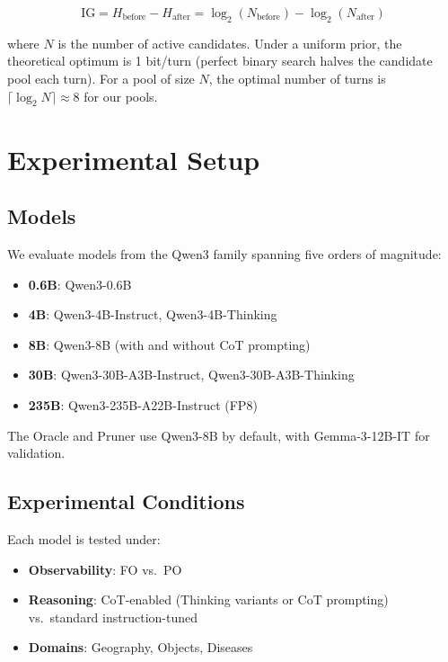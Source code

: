 \documentclass[11pt]{article}
\begin{document}
\begin{equation}
    \text{IG} = H_{\text{before}} - H_{\text{after}} = \log_2(N_{\text{before}}) - \log_2(N_{\text{after}})
\end{equation}

where $N$ is the number of active candidates. Under a uniform prior, the theoretical optimum is 1 bit/turn (perfect binary search halves the candidate pool each turn). For a pool of size $N$, the optimal number of turns is $\lceil \log_2 N \rceil \approx 8$ for our pools.

\section{Experimental Setup}
\label{sec:setup}

\subsection{Models}

We evaluate models from the Qwen3 family spanning five orders of magnitude:
\begin{itemize}
    \item \textbf{0.6B}: Qwen3-0.6B
    \item \textbf{4B}: Qwen3-4B-Instruct, Qwen3-4B-Thinking
    \item \textbf{8B}: Qwen3-8B (with and without CoT prompting)
    \item \textbf{30B}: Qwen3-30B-A3B-Instruct, Qwen3-30B-A3B-Thinking
    \item \textbf{235B}: Qwen3-235B-A22B-Instruct (FP8)
\end{itemize}

The Oracle and Pruner use Qwen3-8B by default, with Gemma-3-12B-IT for validation.

\subsection{Experimental Conditions}

Each model is tested under:
\begin{itemize}
    \item \textbf{Observability}: FO vs.\ PO
    \item \textbf{Reasoning}: CoT-enabled (Thinking variants or CoT prompting) vs.\ standard instruction-tuned
    \item \textbf{Domains}: Geography, Objects, Diseases
\end{itemize}
\end{document}
